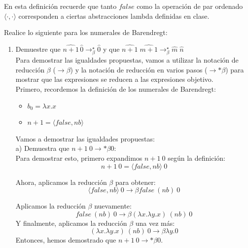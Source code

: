 \documentclass{article}
\begin{document}
\begin{enumerate}
        En esta definición recuerde que tanto $false$ como la operación de par ordenado $\langle\cdot,\cdot\rangle$ corresponden a ciertas abstracciones lambda definidas en clase.

        \medskip

        Realice lo siguiente para los numerales de Barendregt:

        \begin{enumerate}
            \item Demuestre que $\widehat{n+1}\,\widehat{0}\to^\star_\beta \widehat{0}$ y que $\widehat{n+1}\;\widehat{m+1}\to^\star_\beta \widehat{m}\;\widehat{n}$\\

            Para demostrar las igualdades propuestas, vamos a utilizar la notación de reducción $\beta$ (\(\rightarrow\beta\)) y la notación de reducción en varios pasos (\(\rightarrow*\beta\)) para mostrar que las expresiones se reducen a las expresiones objetivo.\\
            Primero, recordemos la definición de los numerales de Barendregt:
            \begin{itemize}
                \item \(b_0 = \lambda x.x\)
                \item \(n+1 = ⟨false, nb⟩\)
                \end{itemize}

            Vamos a demostrar las igualdades propuestas:\\
            a) Demuestra que \(n+1\ 0 \rightarrow*\beta 0\):\\
            Para demostrar esto, primero expandimos \(n+1\ 0\) según la definición:\\
            \[
            n+1\ 0 = ⟨false, nb⟩\ 0
            \]

            Ahora, aplicamos la reducción $\beta$ para obtener:\\
            \[
            ⟨false, nb⟩\ 0 \rightarrow\beta false\ (nb)\ 0
            \]

            Aplicamos la reducción $\beta$ nuevamente:\\
            \[
            false\ (nb)\ 0 \rightarrow\beta (\lambda x.\lambda y.x)\ (nb)\ 0
            \]
            Y finalmente, aplicamos la reducción $\beta$ una vez más:\\
            \[
            (\lambda x.\lambda y.x)\ (nb)\ 0 \rightarrow\beta \lambda y.0
            \]
            Entonces, hemos demostrado que \(n+1\ 0 \rightarrow*\beta 0\).


\end{enumerate}
\end{enumerate}
\end{document}
